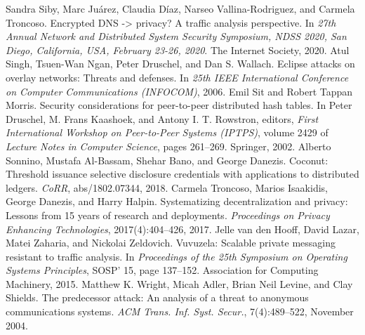 \documentclass{article}
\begin{document}
\begin{thebibliography}{200}
Sandra Siby, Marc Juárez, Claudia Díaz, Narseo Vallina-Rodriguez, and Carmela Troncoso. Encrypted DNS -> privacy? A traffic analysis perspective. In \emph{27th Annual Network and Distributed System Security Symposium, NDSS 2020, San Diego, California, USA, February 23-26, 2020}. The Internet Society, 2020.
Atul Singh, Tsuen-Wan Ngan, Peter Druschel, and Dan S. Wallach. Eclipse attacks on overlay networks: Threats and defenses. In \emph{25th IEEE International Conference on Computer Communications (INFOCOM)}, 2006.
Emil Sit and Robert Tappan Morris. Security considerations for peer-to-peer distributed hash tables. In Peter Druschel, M. Frans Kaashoek, and Antony I. T. Rowstron, editors, \emph{First International Workshop on Peer-to-Peer Systems (IPTPS)}, volume 2429 of \emph{Lecture Notes in Computer Science}, pages 261–269. Springer, 2002.
Alberto Sonnino, Mustafa Al-Bassam, Shehar Bano, and George Danezis. Coconut: Threshold issuance selective disclosure credentials with applications to distributed ledgers. \emph{CoRR}, abs/1802.07344, 2018.
Carmela Troncoso, Marios Isaakidis, George Danezis, and Harry Halpin. Systematizing decentralization and privacy: Lessons from 15 years of research and deployments. \emph{Proceedings on Privacy Enhancing Technologies}, 2017(4):404–426, 2017.
Jelle van den Hooff, David Lazar, Matei Zaharia, and Nickolai Zeldovich. Vuvuzela: Scalable private messaging resistant to traffic analysis. In \emph{Proceedings of the 25th Symposium on Operating Systems Principles}, SOSP' 15, page 137–152. Association for Computing Machinery, 2015.
Matthew K. Wright, Micah Adler, Brian Neil Levine, and Clay Shields. The predecessor attack: An analysis of a threat to anonymous communications systems. \emph{ACM Trans. Inf. Syst. Secur.}, 7(4):489–522, November 2004.
	
\end{thebibliography}
	
\end{document}
